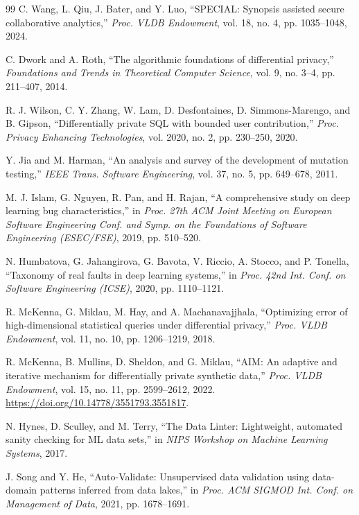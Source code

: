\begin{thebibliography}{99}
C. Wang, L. Qiu, J. Bater, and Y. Luo, ``SPECIAL: Synopsis assisted secure collaborative
analytics,'' \emph{Proc. VLDB Endowment}, vol. 18, no. 4, pp. 1035--1048, 2024.

C. Dwork and A. Roth, ``The algorithmic foundations of differential privacy,'' \emph{Foundations and
Trends in Theoretical Computer Science}, vol. 9, no. 3--4, pp. 211--407, 2014.

R. J. Wilson, C. Y. Zhang, W. Lam, D. Desfontaines, D. Simmons-Marengo, and B. Gipson,
``Differentially private SQL with bounded user contribution,'' \emph{Proc. Privacy Enhancing
Technologies}, vol. 2020, no. 2, pp. 230--250, 2020.

Y. Jia and M. Harman, ``An analysis and survey of the development of mutation testing,'' \emph{IEEE
Trans. Software Engineering}, vol. 37, no. 5, pp. 649--678, 2011.

M. J. Islam, G. Nguyen, R. Pan, and H. Rajan, ``A comprehensive study on deep learning bug
characteristics,'' in \emph{Proc. 27th ACM Joint Meeting on European Software Engineering Conf. and
Symp. on the Foundations of Software Engineering (ESEC/FSE)}, 2019, pp. 510--520.

N. Humbatova, G. Jahangirova, G. Bavota, V. Riccio, A. Stocco, and P. Tonella, ``Taxonomy of real
faults in deep learning systems,'' in \emph{Proc. 42nd Int. Conf. on Software Engineering (ICSE)},
2020, pp. 1110--1121.

R. McKenna, G. Miklau, M. Hay, and A. Machanavajjhala, ``Optimizing error of high-dimensional
statistical queries under differential privacy,'' \emph{Proc. VLDB Endowment}, vol. 11, no. 10,
pp. 1206--1219, 2018.

R. McKenna, B. Mullins, D. Sheldon, and G. Miklau, ``AIM: An adaptive and iterative mechanism for
differentially private synthetic data,'' \emph{Proc. VLDB Endowment}, vol. 15, no. 11, pp. 2599--2612,
2022. \url{https://doi.org/10.14778/3551793.3551817}.

N. Hynes, D. Sculley, and M. Terry, ``The Data Linter: Lightweight, automated sanity checking for
ML data sets,'' in \emph{NIPS Workshop on Machine Learning Systems}, 2017.

J. Song and Y. He, ``Auto-Validate: Unsupervised data validation using data-domain patterns inferred
from data lakes,'' in \emph{Proc. ACM SIGMOD Int. Conf. on Management of Data}, 2021,
pp. 1678--1691.


\end{thebibliography}
